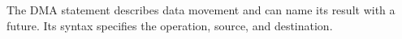 The DMA statement describes data movement and can name its result with a future. Its syntax specifies the operation, source, and destination.
